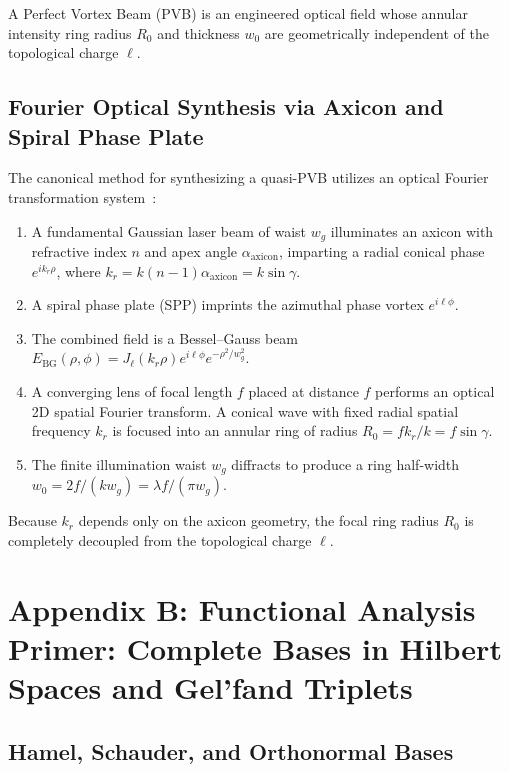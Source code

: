 \documentclass[11pt,a4paper]{article}
\begin{document}
A Perfect Vortex Beam (PVB) is an engineered optical field whose annular intensity ring radius $R_0$ and thickness $w_0$ are geometrically independent of the topological charge $\ell$.

\subsection{Fourier Optical Synthesis via Axicon and Spiral Phase Plate}

The canonical method for synthesizing a quasi-PVB utilizes an optical Fourier transformation system~\cite{Vaity2015}:
\begin{enumerate}
    \item A fundamental Gaussian laser beam of waist $w_g$ illuminates an axicon with refractive index $n$ and apex angle $\alpha_{\text{axicon}}$, imparting a radial conical phase $e^{i k_r \rho}$, where $k_r = k (n-1) \alpha_{\text{axicon}} = k \sin \gamma$.
    \item A spiral phase plate (SPP) imprints the azimuthal phase vortex $e^{i \ell \phi}$.
    \item The combined field is a Bessel--Gauss beam $E_{\text{BG}}(\rho, \phi) = J_\ell(k_r \rho) e^{i \ell \phi} e^{-\rho^2 / w_g^2}$.
    \item A converging lens of focal length $f$ placed at distance $f$ performs an optical 2D spatial Fourier transform. A conical wave with fixed radial spatial frequency $k_r$ is focused into an annular ring of radius $R_0 = f k_r / k = f \sin \gamma$.
    \item The finite illumination waist $w_g$ diffracts to produce a ring half-width $w_0 = 2f / (k w_g) = \lambda f / (\pi w_g)$.
\end{enumerate}

Because $k_r$ depends only on the axicon geometry, the focal ring radius $R_0$ is completely decoupled from the topological charge $\ell$.

\section{Appendix B: Functional Analysis Primer: Complete Bases in Hilbert Spaces and Gel'fand Triplets}
\label{app:hilbert}

\subsection{Hamel, Schauder, and Orthonormal Bases}
\end{document}
